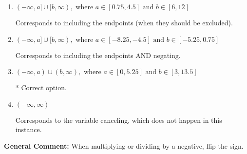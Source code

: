 \documentclass{extbook}[14pt]
\begin{document}
\begin{enumerate}
{\begin{enumerate}[label=\Alph*.]
Corresponds to inverting the inequality and negating the solution.
\item \( (-\infty, a] \cup [b, \infty), \text{ where } a \in [0.75, 4.5] \text{ and } b \in [6, 12] \)

Corresponds to including the endpoints (when they should be excluded).
\item \( (-\infty, a] \cup [b, \infty), \text{ where } a \in [-8.25, -4.5] \text{ and } b \in [-5.25, 0.75] \)

Corresponds to including the endpoints AND negating.
\item \( (-\infty, a) \cup (b, \infty), \text{ where } a \in [0, 5.25] \text{ and } b \in [3, 13.5] \)

 * Correct option.
\item \( (-\infty, \infty) \)

Corresponds to the variable canceling, which does not happen in this instance.
\end{enumerate}

\textbf{General Comment:} When multiplying or dividing by a negative, flip the sign.
}
\end{enumerate}
\end{document}
